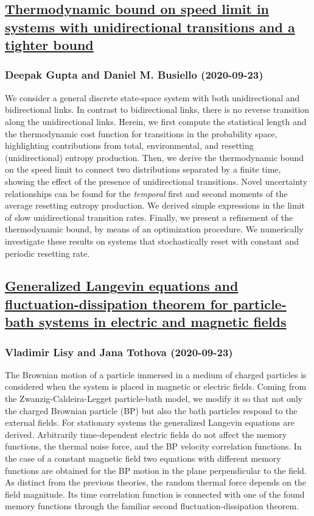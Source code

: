 \subsection*{\href{http://arxiv.org/abs/2009.11115v1}{Thermodynamic bound on speed limit in systems with unidirectional  transitions and a tighter bound}}
\subsubsection*{Deepak Gupta and Daniel M. Busiello (2020-09-23)}
We consider a general discrete state-space system with both unidirectional
and bidirectional links. In contrast to bidirectional links, there is no
reverse transition along the unidirectional links. Herein, we first compute the
statistical length and the thermodynamic cost function for transitions in the
probability space, highlighting contributions from total, environmental, and
resetting (unidirectional) entropy production. Then, we derive the
thermodynamic bound on the speed limit to connect two distributions separated
by a finite time, showing the effect of the presence of unidirectional
transitions. Novel uncertainty relationships can be found for the
\textit{temporal} first and second moments of the average resetting entropy
production. We derived simple expressions in the limit of slow unidirectional
transition rates. Finally, we present a refinement of the thermodynamic bound,
by means of an optimization procedure. We numerically investigate these results
on systems that stochastically reset with constant and periodic resetting rate.

\subsection*{\href{http://arxiv.org/abs/2009.11091v1}{Generalized Langevin equations and fluctuation-dissipation theorem for  particle-bath systems in electric and magnetic fields}}
\subsubsection*{Vladimir Lisy and Jana Tothova (2020-09-23)}
The Brownian motion of a particle immersed in a medium of charged particles
is considered when the system is placed in magnetic or electric fields. Coming
from the Zwanzig-Caldeira-Legget particle-bath model, we modify it so that not
only the charged Brownian particle (BP) but also the bath particles respond to
the external fields. For stationary systems the generalized Langevin equations
are derived. Arbitrarily time-dependent electric fields do not affect the
memory functions, the thermal noise force, and the BP velocity correlation
functions. In the case of a constant magnetic field two equations with
different memory functions are obtained for the BP motion in the plane
perpendicular to the field. As distinct from the previous theories, the random
thermal force depends on the field magnitude. Its time correlation function is
connected with one of the found memory functions through the familiar second
fluctuation-dissipation theorem.


